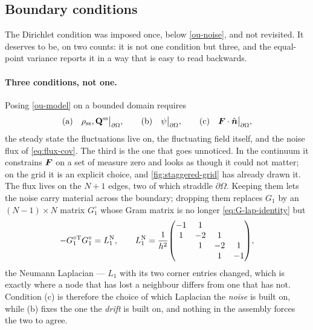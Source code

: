 \documentclass[a5paper]{article}
\begin{document}
\subsection{Boundary conditions}
\label{sec-bc}

The Dirichlet condition was imposed once, below \eqref{ou-noise}, and not revisited. It deserves to be, on two counts: it is not one condition but three, and the equal-point variance reports it in a way that is easy to read backwards.

\paragraph{Three conditions, not one.} Posing \eqref{ou-model} on a bounded domain requires
\begin{equation}
    \label{eq:bc-triple}
    \text{(a)}\quad \rho_{\mathrm{ss}},\mathbf{Q}^{\mathrm{ss}}\big|_{\partial\Omega},
    \qquad
    \text{(b)}\quad \psi\big|_{\partial\Omega},
    \qquad
    \text{(c)}\quad \boldsymbol F\cdot\hat{\boldsymbol{n}}\big|_{\partial\Omega},
\end{equation}
the steady state the fluctuations live on, the fluctuating field itself, and the noise flux of \eqref{eq:flux-cov}. The third is the one that goes unnoticed. In the continuum it constrains $\boldsymbol F$ on a set of measure zero and looks as though it could not matter; on the grid it is an explicit choice, and \cref{fig:staggered-grid} has already drawn it. The flux lives on the $N+1$ edges, two of which straddle $\partial\Omega$. Keeping them lets the noise carry material across the boundary; dropping them replaces $G_1$ by an $(N{-}1)\times N$ matrix $G_1^\circ$ whose Gram matrix is no longer \eqref{eq:G-lap-identity} but
\begin{equation}
    \label{eq:G-neumann}
    -G_1^{\circ\mathrm{T}}G_1^\circ = L_1^{\mathrm N},
    \qquad
    L_1^{\mathrm N} = \frac{1}{h^2}\!\begin{pmatrix} -1&1&&\\ 1&-2&1&\\ &1&-2&1\\ &&1&-1 \end{pmatrix}\!,
\end{equation}
the Neumann Laplacian --- $L_1$ with its two corner entries changed, which is exactly where a node that has lost a neighbour differs from one that has not. Condition (c) is therefore the choice of which Laplacian the \emph{noise} is built on, while (b) fixes the one the \emph{drift} is built on, and nothing in the assembly forces the two to agree.
\end{document}
